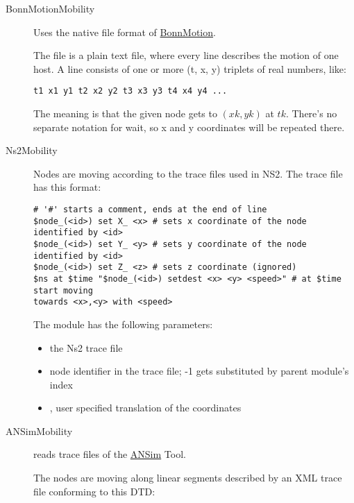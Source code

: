 \begin{description}

\item[BonnMotionMobility] Uses the native file format of
\href{http://www.cs.uni-bonn.de/IV/BonnMotion/}{BonnMotion}.

The file is a plain text file, where every line describes the motion
of one host. A line consists of one or more (t, x, y) triplets of real
numbers, like:

\begin{verbatim}
t1 x1 y1 t2 x2 y2 t3 x3 y3 t4 x4 y4 ...
\end{verbatim}

The meaning is that the given node gets to $(xk,yk)$ at $tk$. There's no
separate notation for wait, so x and y coordinates will be repeated there.

\item[Ns2Mobility] Nodes are moving according to the trace files used
in NS2.
The trace file has this format:

\begin{verbatim}
# '#' starts a comment, ends at the end of line
$node_(<id>) set X_ <x> # sets x coordinate of the node identified by <id>
$node_(<id>) set Y_ <y> # sets y coordinate of the node identified by <id>
$node_(<id>) set Z_ <z> # sets z coordinate (ignored)
$ns at $time "$node_(<id>) setdest <x> <y> <speed>" # at $time start moving
towards <x>,<y> with <speed>
\end{verbatim}

The  module has the following parameters:

\begin{itemize}
  \item {} the Ns2 trace file
  \item {} node identifier in the trace file; -1 gets substituted by
  parent module's index
  \item {}, user specified translation of the
  coordinates
\end{itemize}


\item[ANSimMobility] reads trace files of the \href{http://www.ansim.info}{ANSim} Tool. 

The nodes are moving along linear segments described by an XML trace file
conforming to this DTD:


\end{description}
